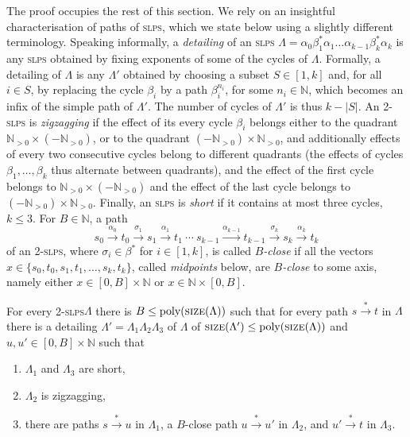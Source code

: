 \documentclass[a4paper, UKenglish, cleveref, autoref, thm-restate]{lipics-v2021}
\newcommand{\N}{\mathbb{N}}
\newcommand{\card}[1]{\left|#1\right|}
\newcommand{\trans}[1]{\stackrel{#1}{\longrightarrow}}
\newcommand{\tran}{\trans{*}}
\newcommand{\slps}{\textsc{slps}\xspace}
\newcommand{\size}{\textsc{size}}
\newcommand{\poly}{\textup{poly}}
\newcommand{\dslps}{2-\slps}
\newcommand{\setfromto}[2]{[#1, #2]}
\newcommand{\setto}[1]{\setfromto 1 {#1}}
\newcommand{\Npos}{\N_{>0}}
\begin{document}
\begin{appendixproof}
The proof occupies the rest of this section.
We rely on an insightful characterisation of paths of \slps \cite[Theorem 4.16]{DBLP:conf/focs/0001CMOSW24},
which we state below using a slightly different terminology.
Speaking informally, a \emph{detailing} of an \slps 
$\Lambda = \alpha_0 \beta_1^* \alpha_1 \ldots \alpha_{k-1} \beta_k^* \alpha_k$
is any \slps obtained by fixing exponents of some of the cycles of $\Lambda$.
Formally, a detailing of $\Lambda$ is any $\Lambda'$ obtained by choosing a subset $S \in [1,k]$ and,
for all $i \in S$, by replacing the cycle $\beta_i$ by a path $\beta_i^{n_i}$, for some $n_i\in\N$, 
which becomes an infix of the simple path of $\Lambda'$.
The number of cycles of $\Lambda'$ is thus $k-\card{S}$.
An \dslps is \emph{zigzagging} if the effect of its every cycle $\beta_i$ 
belongs either to the quadrant $\Npos \times (-\Npos)$,
or to the quadrant $(-\Npos) \times \Npos$, and additionally effects of every two consecutive cycles belong 
to different quadrants
(the effects of cycles $\beta_1, \ldots, \beta_k$ thus alternate between quadrants), and the effect of the first cycle belongs to $\Npos \times (-\Npos)$ and the effect of the last cycle belongs to $(-\Npos) \times \Npos$.
Finally, an \slps is \emph{short} if it contains at most three cycles, $k\leq 3$.
For $B\in\N$,
a path 
\[
s_0 \trans{\alpha_0} t_0 \trans{\sigma_1} s_1 \trans{\alpha_1} t_1 \ \cdots \ s_{k-1} \trans{\alpha_{k-1}} t_{k-1} \trans{\sigma_{k}} s_k \trans{\alpha_k} t_k
\]
of an \dslps,
where $\sigma_i \in\beta^*$ for $i\in\setto k$, is called \emph{$B$-close} if all the vectors $x\in \{s_0, t_0, s_1, t_1, \ldots, s_k, t_k\}$,
called \emph{midpoints} below,
are \emph{$B$-close} to some axis, namely either $x\in \setfromto 0 B \times \N$ or 
$x\in \N\times\setfromto 0 B$.

\begin{theorem}\label{thm:2slps-zigzag}
For every \dslps $\Lambda$ there is $B\leq \poly(\size(\Lambda))$
such that for every path $s \tran t$ in $\Lambda$ 
there is a detailing $\Lambda' = \Lambda_1 \Lambda_2 \Lambda_3$ of $\Lambda$  
of $\size(\Lambda')\leq \poly(\size(\Lambda))$ and $u, u' \in \setfromto 0 B \times \N$ such that
\begin{enumerate}
\item $\Lambda_1$ and $\Lambda_3$ are short, 
  \item $\Lambda_2$ is zigzagging,
  \item there are paths $s \tran u$ in $\Lambda_1$, 
  a $B$-close path $u \tran u'$ in $\Lambda_2$, and 
  $u'\tran t$ in $\Lambda_3$.
\end{enumerate}
\end{theorem}


\end{appendixproof}
\end{document}
